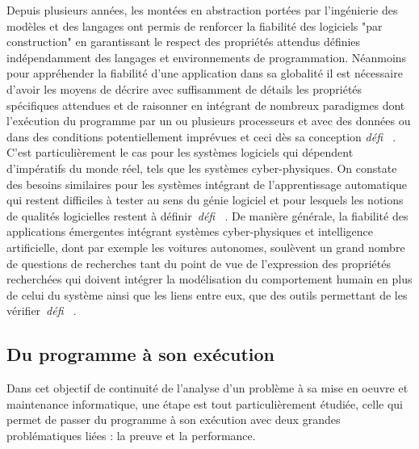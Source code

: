 \documentclass[11pt]{article}
\newcommand{\defi}[1]{\emph{défi~%
\cite{#1}}}
\begin{document}
Depuis plusieurs années, les montées en abstraction portées par l'ingénierie des modèles et des langages ont permis de renforcer la fiabilité des logiciels "par construction" en garantissant le respect des propriétés attendus définies indépendamment des langages et environnements de programmation. 
Néanmoins pour appréhender la fiabilité d'une application dans sa globalité il est nécessaire d'avoir les moyens de décrire avec suffisamment de détails les propriétés spécifiques attendues et de raisonner en intégrant de nombreux paradigmes dont l’exécution du programme par un ou plusieurs processeurs et avec des données ou dans des conditions potentiellement imprévues et ceci dès sa conception \defi{reconfiguration, compilation}. 
%
C'est particulièrement le cas pour les systèmes logiciels qui dépendent d'impératifs du monde réel, tels que les systèmes cyber-physiques. On constate des besoins similaires pour les systèmes intégrant de l'apprentissage automatique qui restent difficiles à tester au sens du génie logiciel et pour lesquels les notions de qualités logicielles restent à définir~\defi{IA}.  De manière générale, la fiabilité des  applications émergentes intégrant  systèmes cyber-physiques et intelligence artificielle, dont par exemple les voitures autonomes, soulèvent  un grand nombre de questions de recherches tant du point de vue de l'expression des propriétés recherchées qui doivent intégrer la modélisation du comportement humain en plus de celui du système ainsi que les liens entre eux, que des outils permettant de les vérifier~\defi{emergents}.


\subsection{Du programme à son exécution\label{ss:fiabilite:execution}}
Dans cet objectif de continuité de l'analyse d'un problème à sa mise en oeuvre et maintenance informatique, une étape est tout particulièrement étudiée, celle qui permet de passer du programme à son exécution avec deux  grandes problématiques liées : la preuve et la performance.
\end{document}
